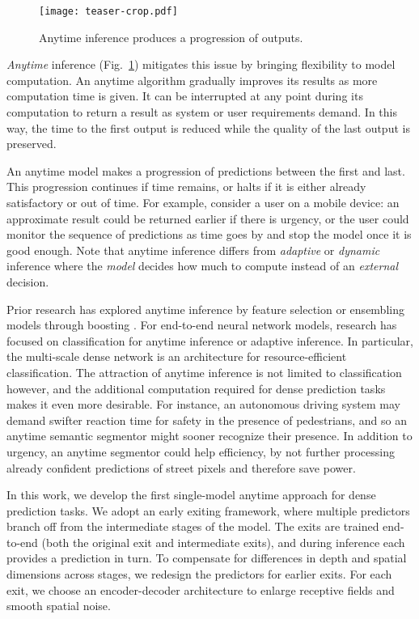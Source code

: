 \begin{figure}
   \begin{center}
    \texttt{[image: teaser-crop.pdf]}
   \end{center}
    \caption{%
    Anytime inference produces a progression of outputs.
    }
    \label{fig:teaser}
\end{figure}

\emph{Anytime} inference (Fig.~\ref{fig:teaser}) mitigates this issue by bringing flexibility to model computation.
An anytime algorithm \cite{dean1988analysis} gradually improves its results as more computation time is given.
It can be interrupted at any point during its computation to return a result as system or user requirements demand.
In this way, the time to the first output is reduced while the quality of the last output is preserved.

An anytime model makes a progression of predictions between the first and last.
This progression continues if time remains, or halts if it is either already satisfactory or out of time.
For example, consider a user on a mobile device: an approximate result could be returned earlier if there is urgency, or the user could monitor the sequence of predictions as time goes by and stop the model once it is good enough.
Note that anytime inference differs from \emph{adaptive} or \emph{dynamic} inference \cite{veit2018convolutional,Wu2018BlockDropDI,wang2018skipnet} where the \emph{model} decides how much to compute instead of an \emph{external} decision. 


Prior research has explored anytime inference by feature selection \cite{karayev2014anytime} or ensembling models through boosting \cite{grubb2012speedboost}.
For end-to-end neural network models, research has focused on classification for anytime inference or adaptive inference.
In particular, the multi-scale dense network \cite{huang2017multi} is an architecture for resource-efficient classification.
The attraction of anytime inference is not limited to classification however, and the additional computation required for dense prediction tasks makes it even more desirable.
For instance, an autonomous driving system may demand swifter reaction time for safety in the presence of pedestrians, and so an anytime semantic segmentor might sooner recognize their presence.
In addition to urgency, an anytime segmentor could help efficiency, by not further processing already confident predictions of street pixels and therefore save power.

In this work, we develop the first single-model anytime approach for dense prediction tasks.
We adopt an early exiting framework, where multiple predictors branch off from the intermediate stages of the model.
The exits are trained end-to-end (both the original exit and intermediate exits), and during inference each provides a prediction in turn.
To compensate for differences in depth and spatial dimensions across stages, we redesign the predictors for earlier exits.
For each exit, we choose an encoder-decoder architecture to enlarge receptive fields and smooth spatial noise.

